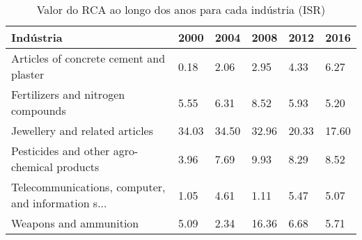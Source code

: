 \begin{table}
\centering
\caption{Valor do RCA ao longo dos anos para cada indústria (ISR)}
\begin{tabular}{p{6cm}p{1.5cm}p{1.5cm}p{1.5cm}p{1.5cm}p{1.5cm}}
\toprule
                                         Indústria &  2000 &  2004 &  2008 &  2012 &  2016 \\
\midrule
           Articles of concrete cement and plaster &  0.18 &  2.06 &  2.95 &  4.33 &  6.27 \\
                Fertilizers and nitrogen compounds &  5.55 &  6.31 &  8.52 &  5.93 &  5.20 \\
                    Jewellery and related articles & 34.03 & 34.50 & 32.96 & 20.33 & 17.60 \\
       Pesticides and other agro-chemical products &  3.96 &  7.69 &  9.93 &  8.29 &  8.52 \\
Telecommunications, computer, and information s... &  1.05 &  4.61 &  1.11 &  5.47 &  5.07 \\
                            Weapons and ammunition &  5.09 &  2.34 & 16.36 &  6.68 &  5.71 \\
\bottomrule
\end{tabular}
\end{table}
